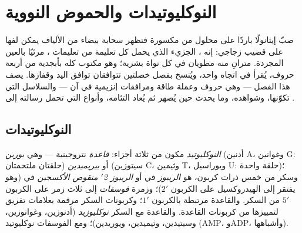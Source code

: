 \chapter{النوكليوتيدات والحموض النووية}\label{ch:b1:nucleic-acids}

صبّ إيثانولًا باردًا على محلول من  مكسورة فتظهر سحابة بيضاء من
الألياف يمكن لفها على قضيب زجاجي: إنه ، الجزيء الذي يحمل كل تعليمة
من تعليمات ، مرئيًا بالعين المجردة. مترانِ منه مطويان في
كل نواة بشرية؛ وهو مكتوب كله بأبجدية من أربعة حروف، يُقرأ في اتجاه
واحد، ويُنسخ بفصل خصلتين تتوافقان توافق اليد وقفازها. يصف هذا الفصل
 --- وهي حروف وعملة طاقة ومرافقات إنزيمية في آن ---
والسلاسل التي تكوّنها،  وشواهده، وما يحدث حين يُصهر
ثم يُعاد التئامه، وأنواع  التي تحمل رسالته إلى .

\section{النوكليوتيدات}

\begin{definition}[النوكليوتيد]\label{def:b1:nucleic-acids:nucleotide}
\emph{النوكليوتيد} مكون من ثلاثة أجزاء:
\emph{قاعدة} نتروجينية --- وهي
\emph{بورين} (أدنين A، وغوانين G: حلقتان ملتحمتان) أو
\emph{بيريميدين} (سيتوزين C، وثيمين T، ويوراسيل U:
حلقة واحدة)؛ وسكر من خمس ذرات كربون، هو \emph{الريبوز} في  أو
\emph{الريبوز 2$'$ منقوص الأكسجين} في  (وهو يفتقر إلى الهيدروكسيل
على الكربون $2'$)؛ وزمرة \emph{فوسفات} إلى ثلاث زمر على الكربون
$5'$ من السكر. والقاعدة مرتبطة بالكربون $1'$؛ وكربونات السكر مرقمة
بعلامات تفريق لتمييزها من كربونات القاعدة. والقاعدة مع السكر
\emph{نوكليوزيد} (أدنوزين، وغوانوزين، وسيتيدين، وثيميدين، ويوريدين)؛
ومع الفوسفات نوكليوتيد (AMP، وADP،  وأشباهها).
\end{definition}

